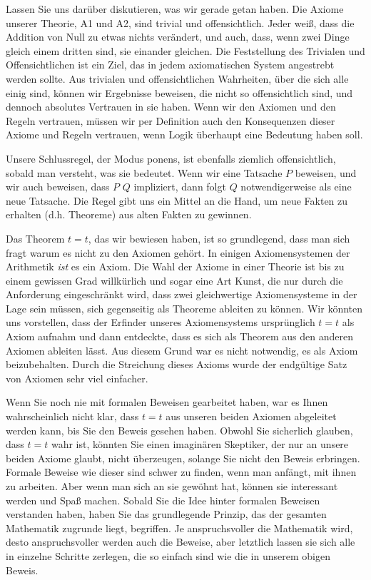 Lassen Sie uns darüber diskutieren, was wir gerade getan haben.  Die Axiome unserer Theorie, A1 und A2, sind trivial und offensichtlich.  Jeder weiß, dass die Addition von Null zu etwas nichts verändert, und auch, dass, wenn zwei Dinge gleich einem dritten sind, sie einander gleichen. Die Feststellung des Trivialen und Offensichtlichen ist ein Ziel, das in jedem axiomatischen System angestrebt werden sollte.  Aus trivialen und offensichtlichen Wahrheiten, über die sich alle einig sind, können wir Ergebnisse beweisen, die nicht so offensichtlich sind, und dennoch absolutes Vertrauen in sie haben.  Wenn wir den Axiomen und den Regeln vertrauen, müssen wir per Definition auch den Konsequenzen dieser Axiome und Regeln vertrauen, wenn Logik überhaupt eine Bedeutung haben soll.

Unsere Schlussregel, der Modus ponens, ist ebenfalls ziemlich offensichtlich, sobald man versteht, was sie bedeutet.  Wenn wir eine Tatsache $P$ beweisen, und wir auch beweisen, dass $P$ $Q$ impliziert, dann folgt $Q$ notwendigerweise als eine neue Tatsache.  Die Regel gibt uns ein Mittel an die Hand, um neue Fakten zu erhalten (d.h. Theoreme) aus alten Fakten zu gewinnen.

Das Theorem $ t=t$, das wir bewiesen haben, ist so grundlegend, dass man sich fragt warum es nicht zu den Axiomen gehört.  In einigen Axiomensystemen der Arithmetik {\em ist} es ein Axiom.  Die Wahl der Axiome in einer Theorie ist bis zu einem gewissen Grad willkürlich und sogar eine Art Kunst, die nur durch die Anforderung eingeschränkt wird, dass zwei gleichwertige Axiomensysteme in der Lage sein müssen, sich gegenseitig als Theoreme ableiten zu können.  Wir könnten uns vorstellen, dass der Erfinder unseres Axiomensystems ursprünglich $ t=t$ als Axiom aufnahm und dann entdeckte, dass es sich als Theorem aus den anderen Axiomen ableiten lässt.  Aus diesem Grund war es nicht notwendig, es als Axiom beizubehalten.  Durch die Streichung dieses Axioms wurde der endgültige Satz von Axiomen sehr viel einfacher.

Wenn Sie noch nie mit formalen Beweisen gearbeitet haben, war es Ihnen wahrscheinlich nicht klar, dass $ t=t$ aus unseren beiden Axiomen abgeleitet werden kann, bis Sie den Beweis gesehen haben. Obwohl Sie sicherlich glauben, dass $ t=t$ wahr ist, könnten Sie einen imaginären Skeptiker, der nur an unsere beiden Axiome glaubt, nicht überzeugen, solange Sie nicht den Beweis erbringen.  Formale Beweise wie dieser sind schwer zu finden, wenn man anfängt, mit ihnen zu arbeiten. Aber wenn man sich an sie gewöhnt hat, können sie interessant werden und Spaß machen.  Sobald Sie die Idee hinter formalen Beweisen verstanden haben, haben Sie das grundlegende Prinzip, das der gesamten Mathematik zugrunde liegt, begriffen.  Je anspruchsvoller die Mathematik wird, desto anspruchsvoller werden auch die Beweise, aber letztlich lassen sie sich alle in einzelne Schritte zerlegen, die so einfach sind wie die in unserem obigen Beweis.

